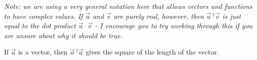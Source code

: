 \begin{questions}
\begin{center}
\begin{tabular}{|C{2in}| C{2in} | C{2in}|}
				
			\end{tabular}
			\end{center}
		
		\emph{Note: we are using a very general notation here that allows vectors and functions to have complex values. If $\vec u$ and $\vec{v}$ are purely real, however, then $\vec u \,^\dag \vec v$ is just equal to the dot product $\vec u \cdot \vec v$ - I encourage you to try working through this if you are unsure about why it should be true.}
		
		\contdnewpg
		
		\newpage
		\question If $\vec a$ is a vector, then $\vec a\,^\dag \vec a$ gives the square of the length of the vector.
\end{questions}
